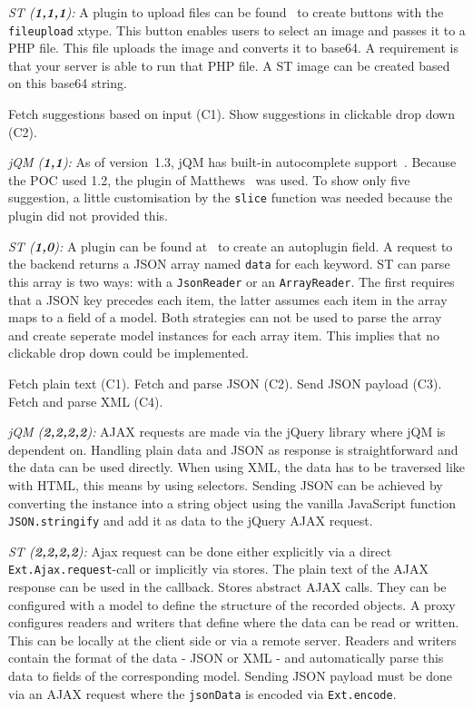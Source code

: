 \documentclass[a4paper]{artikel3}
\newcommand{\code}[1]{\texttt{#1}}
\renewcommand{\paragraph}[1]{\vspace{2mm} \noindent {\bf #1}  }
\newcommand{\framework}[2]{ \emph{#1 (\textbf{#2}): }} %
\newcommand{\challenge}[1]{\paragraph{#1}}
\begin{document}
\framework{ST}{1,1,1}
A plugin to upload files can be found~\cite{Smirnov2012} to create buttons with the \code{fileupload} xtype.  
This button enables users to select an image and passes it to a PHP file.  
This file uploads the image and converts it to base64.
A requirement is that your server is able to run that PHP file.    
A ST image can be created based on this base64 string.

\challenge{Autocomplete (C1,C2)}
Fetch suggestions based on input (C1).
Show suggestions in clickable drop down (C2).

\framework{jQM}{1,1}
As of version~1.3, jQM has built-in autocomplete support~\cite{JQuery2013c}.
Because the POC used 1.2, the plugin of Matthews~\cite{Matthews2013} was used.
To show only five suggestion, a little customisation by the \code{slice} function was needed because the plugin did not provided this.

\framework{ST}{1,0}
A plugin can be found at~\cite{Mysamplecode2012} to create an autoplugin field.  
A request to the backend returns a JSON array named \code{data} for each keyword.  
ST can parse this array is two ways:  with a \code{JsonReader} or an \code{ArrayReader}.  
The first requires that a JSON key precedes each item,  the latter assumes each item in the array maps to a field of a model.  
Both strategies can not be used to parse the array and create seperate model instances for each array item.  
This implies that no clickable drop down could be implemented.


\challenge{AJAX: text, JSON \& XML}
Fetch plain text (C1).
Fetch and parse JSON (C2).
Send JSON payload (C3).
Fetch and parse XML (C4).

\framework{jQM}{2,2,2,2}
AJAX requests are made via the jQuery library where jQM is dependent on.
Handling plain data and JSON as response is straightforward and the data can be used directly.
When using XML, the data has to be traversed like with HTML, this means by using selectors.
Sending JSON can be achieved by converting the instance into a string object using the vanilla JavaScript function \code{JSON.stringify} and add it as data to the jQuery AJAX request.

\framework{ST}{2,2,2,2}
Ajax request can be done either explicitly via a direct \code{Ext.Ajax.request}-call or implicitly via stores.  
The plain text of the AJAX response can be used in the callback.  
Stores abstract AJAX calls.  
They can be configured with a model to define the structure of the recorded objects.  
A proxy configures readers and writers that define where the data can be read or written.  
This can be locally at the client side or via a remote server.  
Readers and writers contain the format of the data - JSON or XML - and automatically parse this data to fields of the corresponding model. 
Sending JSON payload must be done via an AJAX request where the \code{jsonData} is encoded via \code{Ext.encode}.
\end{document}
